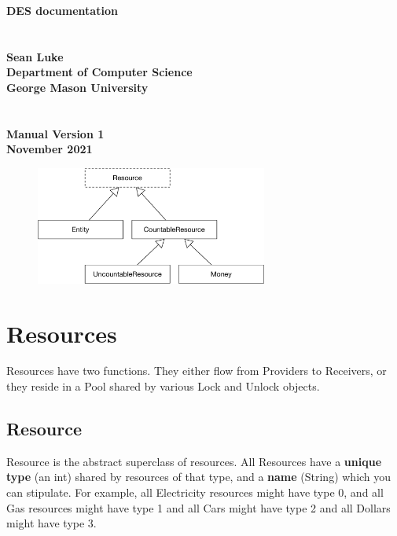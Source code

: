 \documentclass[twoside,10pt]{book}
\newcommand\booktitle{DES documentation}
\begin{document}
\noindent\huge\bf \booktitle\\
\\
\\
\Large\bf Sean Luke\\
{\large\rm 
Department of Computer Science\\
George Mason University}
\\
\\
\\
\large\rm {\bf Manual Version 1}\\
\large\rm November 2021\\

\clearpage



\normalsize
\cleardoublepage

\tableofcontents
\clearpage


\begin{figure}[t]
\centering\includegraphics[width=3in]{Resources.pdf}
\end{figure}


\section{Resources}

Resources have two functions.  They either flow from Providers to Receivers, or they reside in a Pool shared by various Lock and Unlock objects.

\subsection{Resource}

Resource is the abstract superclass of resources.  All Resources have a {\bf unique type} (an int) shared by resources of that type, and a {\bf name} (String) which you can stipulate.  For example, all Electricity resources might have type 0, and all Gas resources might have type 1 and all Cars might have type 2 and all Dollars might have type 3.
\end{document}
